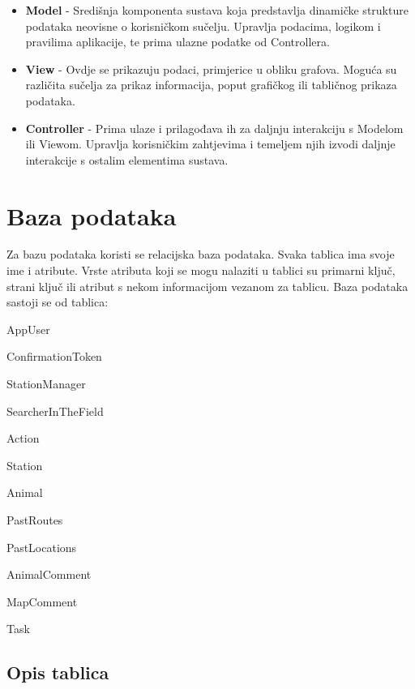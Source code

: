 	\begin{itemize}
		\item \textbf{Model} - Središnja komponenta sustava koja predstavlja dinamičke strukture podataka neovisne o korisničkom sučelju. Upravlja podacima, logikom i pravilima aplikacije, te prima ulazne podatke od Controllera.
		\item \textbf{View} - Ovdje se prikazuju podaci, primjerice u obliku grafova. Moguća su različita sučelja za prikaz informacija, poput grafičkog ili tabličnog prikaza podataka.
		\item \textbf{Controller} - Prima ulaze i prilagođava ih za daljnju interakciju s Modelom ili Viewom. Upravlja korisničkim zahtjevima i temeljem njih izvodi daljnje interakcije s ostalim elementima sustava.
	\end{itemize}
		

		

				
		\section{Baza podataka}
				
				Za bazu podataka koristi se relacijska baza podataka. Svaka tablica ima svoje ime i atribute. Vrste atributa koji se mogu nalaziti u tablici su primarni ključ, strani ključ ili atribut s nekom informacijom vezanom za tablicu. Baza podataka sastoji se od tablica:
		
				\begin{packed_item}
					\item AppUser
					\item ConfirmationToken
					\item StationManager
					\item SearcherInTheField
					\item Action
					\item Station
					\item Animal
					\item PastRoutes
					\item PastLocations
					\item AnimalComment
					\item MapComment
					\item Task
				\end{packed_item}
				
				
		
			\subsection{Opis tablica}
			

